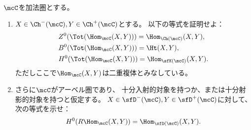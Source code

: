 \documentclass[uplatex,dvipdfmx]{jsarticle}
\begin{document}
\maketitle
\HeaderCommentA
\section{}
\fi


\begin{prob}\label{1.16}
  \(\mcC\)を加法圏とする。
  \begin{enumerate}
    \item \label{1.16.1}
    \(X\in \Ch^-(\mcC), Y\in \Ch^+(\mcC)\)とする。
    以下の等式を証明せよ：
    \begin{align*}
      &Z^0(\Tot(\Hom_{\mcC}(X,Y))) = \Hom_{\Ch(\mcC)}(X,Y), \\
      &B^0(\Tot(\Hom_{\mcC}(X,Y))) = \Ht(X,Y), \\
      &H^0(\Tot(\Hom_{\mcC}(X,Y))) = \Hom_{\sfK(\mcC)}(X,Y).
    \end{align*}
    ただしここで\(\Hom_{\mcC}(X,Y)\)は二重複体とみなしている。
    \item \label{1.16.2}
    さらに\(\mcC\)がアーベル圏であり、
    十分入射的対象を持つか、または十分射影的対象を持つと仮定する。
    \(X\in \sfD^-(\mcC),Y\in \sfD^+(\mcC)\)に対して、
    次の等式を示せ：
    \[
    H^0(R\Hom_{\mcC}(X,Y)) = \Hom_{\sfD(\mcC)}(X,Y).
    \]
  \end{enumerate}
\end{prob}
\end{document}
